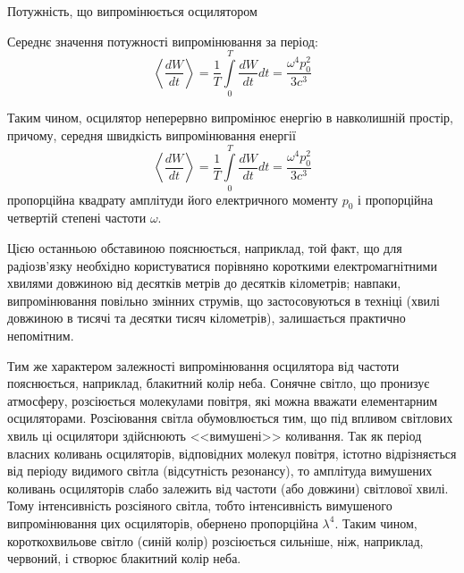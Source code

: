 \documentclass[onlytextwidth]{beamer}
\begin{document}
\begin{frame}{Потужність, що випромінюється осцилятором}{}
\begin{overprint}
		Середнє значення потужності випромінювання за період:
		\begin{equation*}
			\left\langle \frac{d W}{dt} \right\rangle = \frac1T\int\limits_0^T \frac{dW}{dt} dt = \frac{\omega^4p_0^2}{3c^3}
		\end{equation*}
		\onslide<3>
		\begin{block}{}\small\justifying
			Таким чином, осцилятор неперервно випромінює енергію в навколишній простір, причому, середня швидкість випромінювання енергії
			\begin{equation*}
				\left\langle \frac{d W}{dt} \right\rangle = \frac1T\int\limits_0^T \frac{dW}{dt} dt = \frac{\omega^4p_0^2}{3c^3}
			\end{equation*}
			пропорційна квадрату амплітуди його електричного моменту $ p_0 $ і пропорційна четвертій степені частоти $ \omega $.

			\medskip


			Цією останньою обставиною пояснюється, наприклад, той факт, що для радіозв'язку необхідно користуватися порівняно короткими електромагнітними хвилями довжиною від десятків метрів до десятків кілометрів; навпаки, випромінювання повільно змінних струмів, що застосовуються в техніці (хвилі довжиною в тисячі та десятки тисяч кілометрів), залишається практично непомітним.

		\end{block}
		\vspace*{1em}
		\begin{tcolorbox}[enhanced,title={Колір неба},watermark graphics=BlueSky,
				watermark opacity=0.5,watermark color=blue,watermark stretch=1]
			\justifying\small
			Тим же характером залежності випромінювання осцилятора від
			частоти пояснюється, наприклад, блакитний колір неба. Сонячне світло, що пронизує атмосферу, розсіюється молекулами повітря, які можна вважати елементарним осциляторами. Розсіювання світла обумовлюється тим, що під впливом світлових хвиль ці осцилятори здійснюють <<вимушені>>
			коливання. Так як період власних коливань осциляторів, відповідних молекул повітря, істотно відрізняється від періоду видимого світла (відсутність резонансу), то амплітуда вимушених коливань осциляторів слабо залежить від частоти (або довжини) світлової хвилі. Тому інтенсивність
			розсіяного світла, тобто інтенсивність вимушеного випромінювання
			цих осциляторів, обернено пропорційна $ \lambda^4 $. Таким чином, короткохвильове світло (синій колір) розсіюється сильніше, ніж,
			наприклад, червоний, і створює блакитний колір неба.
		\end{tcolorbox}
	\end{overprint}
\end{frame}
\end{document}
